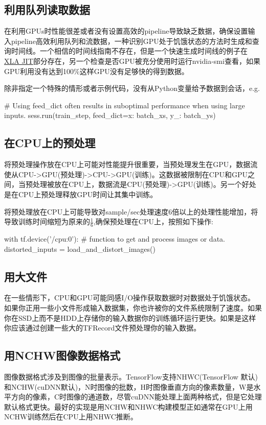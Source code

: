 \subsection{利用队列读取数据}
在利用GPUs时性能很差或者没有设置高效的pipeline导致缺乏数据，确保设置输入pipeline高效利用队列和流数据，一种识别GPU处于饥饿状态的方法时生成和查询时间线。一个相信的时间线指南不存在，但是一个快速生成时间线的例子在\href{https://www.tensorflow.org/performance/xla/jit}{XLA JIT}部分存在，另一个检查是否GPU被充分使用时运行nvidia-smi查看，如果GPU利用没有达到100\%这样GPU没有足够快的得到数据。

除非指定一个特殊的情形或者示例代码，没有从Python变量给予数据到会话，e.g.
\begin{python}
# Using feed_dict often results in suboptimal performance when using large inputs.
sess.run(train_step, feed_dict={x: batch_xs, y_: batch_ys})
\end{python}
\subsection{在CPU上的预处理}
将预处理操作放在CPU上可能对性能提升很重要，当预处理发生在GPU，数据流使从CPU->GPU(预处理)->CPU->GPU(训练)。这数据被限制在CPU和GPU之间，当预处理被放在CPU上，数据流是CPU(预处理)->GPU(训练)。另一个好处是在CPU上预处理释放GPU时间让其集中训练。

将预处理放在CPU上可能导致对sample/sec处理速度6倍以上的处理性能增加，将导致训练时间缩短为原来的$\frac{1}{6}$,确保预处理在CPU上，按照如下操作:
\begin{python}
with tf.device('/cpu:0'):
  # function to get and process images or data.
  distorted_inputs = load_and_distort_images()
\end{python}
\subsection{用大文件}
在一些情形下，CPU和GPU可能同感I/O操作获取数据时对数据处于饥饿状态。如果你正用一些小文件形成输入数据集，你也许被你的文件系统限制了速度。如果你在SSD上而不是HDD上存储你的输入数据你的训练循环运行更快。如果是这样你应该通过创建一些大的TFRecord文件预处理你的输入数据。
\subsection{用NCHW图像数据格式}
图像数据格式涉及到图像的批量表示。TensorFlow支持NHWC(TensorFlow 默认)和NCHW(cuDNN默认)，N时图像的批数，H时图像垂直方向的像素数量，W是水平方向的像素，C时图像的通道数，尽管cuDNN能处理上面两种格式，但是它处理默认格式更快。最好的实现是用NCHW和NHWC构建模型正如通常在GPU上用NCHW训练然后在CPU上用NHWC推断。


